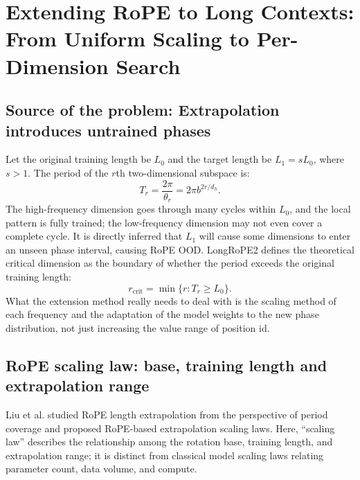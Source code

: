 \documentclass[UTF8,fontset=none,a4paper,10pt]{ctexart}
\begin{document}
\section{Extending RoPE to Long Contexts: From Uniform Scaling to Per-Dimension Search}

\subsection{Source of the problem: Extrapolation introduces untrained phases}

Let the original training length be $L_0$ and the target length be $L_1=sL_0$, where $s>1$. The period of the $r$th two-dimensional subspace is:
\begin{equation}
  T_r=\frac{2\pi}{\theta_r}=2\pi b^{2r/d_h}.
  \label{eq:rope-period}
\end{equation}
The high-frequency dimension goes through many cycles within $L_0$, and the local pattern is fully trained; the low-frequency dimension may not even cover a complete cycle. It is directly inferred that $L_1$ will cause some dimensions to enter an unseen phase interval, causing RoPE OOD. LongRoPE2 defines the theoretical critical dimension as the boundary \cite{longrope2} of whether the period exceeds the original training length:
\begin{equation}
  r_{\mathrm{crit}}=\min\{r:T_r\ge L_0\}.
  \label{eq:critical-dim}
\end{equation}
What the extension method really needs to deal with is the scaling method of each frequency and the adaptation of the model weights to the new phase distribution, not just increasing the value range of position id.

\subsection{RoPE scaling law: base, training length and extrapolation range}

Liu et al. studied RoPE length extrapolation from the perspective of period coverage and proposed RoPE-based extrapolation scaling laws\cite{liu2024scalingrope}. Here, ``scaling law'' describes the relationship among the rotation base, training length, and extrapolation range; it is distinct from classical model scaling laws relating parameter count, data volume, and compute.
\end{document}
